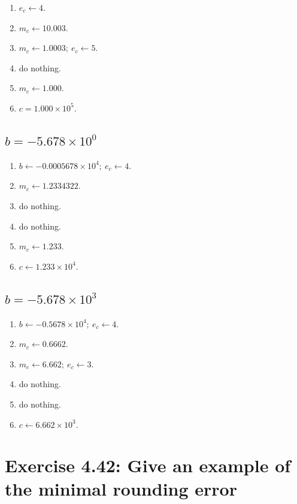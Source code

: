 \documentclass[a4paper]{article}
\begin{document}
\begin{enumerate}
    \item $e_c \leftarrow 4$.
    \item $m_c \leftarrow 10.003$.
    \item $m_c \leftarrow 1.0003;\ e_c \leftarrow 5$.
    \item do nothing.
    \item $m_c \leftarrow 1.000$.
    \item $c = 1.000 \times 10^5$.
\end{enumerate}

\subsection{$b = -5.678 \times 10^0$}

\begin{enumerate}
    \item $b \leftarrow -0.0005678 \times 10^4;\ e_c \leftarrow 4$.
    \item $m_c \leftarrow 1.2334322$.
    \item do nothing.
    \item do nothing.
    \item $m_c \leftarrow 1.233$.
    \item $c \leftarrow 1.233 \times 10^4$.
\end{enumerate}

\subsection{$b = -5.678 \times 10^3$}

\begin{enumerate}
    \item $b \leftarrow -0.5678 \times 10^4;\ e_c \leftarrow 4$.
    \item $m_c \leftarrow 0.6662$.
    \item $m_c \leftarrow 6.662;\ e_c \leftarrow 3$.
    \item do nothing.
    \item do nothing.
    \item $c \leftarrow 6.662 \times 10^3$.
\end{enumerate}

\section{Exercise 4.42: Give an example of the minimal rounding error}
\end{document}
